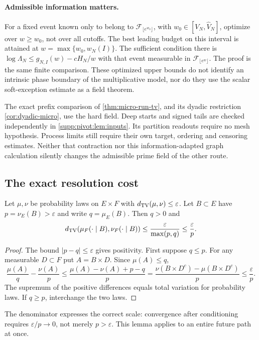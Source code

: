 \paragraph{Admissible information matters.}
For a fixed event known only to belong to
$\mathcal F_{\lfloor e^{w_0}\rfloor}$, with
$w_0\in[V_N,\widehat V_N]$, optimize over $w\ge w_0$, not over all
cutoffs. The best leading budget on this interval is attained at
$w=\max\{w_0,w_N(I)\}$. The sufficient condition there is
$\log\Lambda_N\le g_{N,I}(w)-cH_N/w$ with that event measurable in
$\mathcal F_{\lfloor e^w\rfloor}$. The proof is the same finite
comparison. These optimized upper bounds do not identify an intrinsic
phase boundary of the multiplicative model, nor do they use the scalar
soft-exception estimate as a field theorem.

The exact prefix comparison of \cref{thm:micro-run-tv}, and its dyadic
restriction \cref{cor:dyadic-micro}, use the hard field. Deep starts and
signed tails are checked independently in
\cref{supp:pivot:lem:inputs}. Its partition readouts require no mesh
hypothesis. Process limits still require their own target, ordering and
censoring estimates. Neither that contraction
nor this information-adapted graph calculation silently changes the
admissible prime field of the other route.

\subsection{The exact resolution cost}
\begin{lemma}\label{lem:conditioning-floor}
Let $\mu,\nu$ be probability laws on $E\times F$ with
$d_{\mathrm{TV}}(\mu,\nu)\le\varepsilon$. Let $B\subset E$ have
$p=\nu_E(B)>\varepsilon$ and write $q=\mu_E(B)$. Then $q>0$ and
\begin{equation}\label{eq:sharp-conditioning}
 d_{\mathrm{TV}}(\mu_F(\cdot\mid B),\nu_F(\cdot\mid B))
 \le\frac{\varepsilon}{\max(p,q)}\le\frac{\varepsilon}{p}.
\end{equation}
\end{lemma}
\begin{proof}
The bound $|p-q|\le\varepsilon$ gives positivity. First suppose $q\le p$.
For any measurable $D\subset F$ put $A=B\times D$. Since $\mu(A)\le q$,
\[
 \frac{\mu(A)}q-\frac{\nu(A)}p
 \le\frac{\mu(A)-\nu(A)+p-q}{p}
 =\frac{\nu(B\times D^c)-\mu(B\times D^c)}p
 \le\frac\varepsilon p.
\]
The supremum of the positive differences equals total variation for
probability laws. If $q\ge p$, interchange the two laws.
\end{proof}
The denominator expresses the correct scale: convergence after conditioning
requires $\varepsilon/p\to0$, not merely $p>\varepsilon$.
This lemma applies to an entire future path at once.

